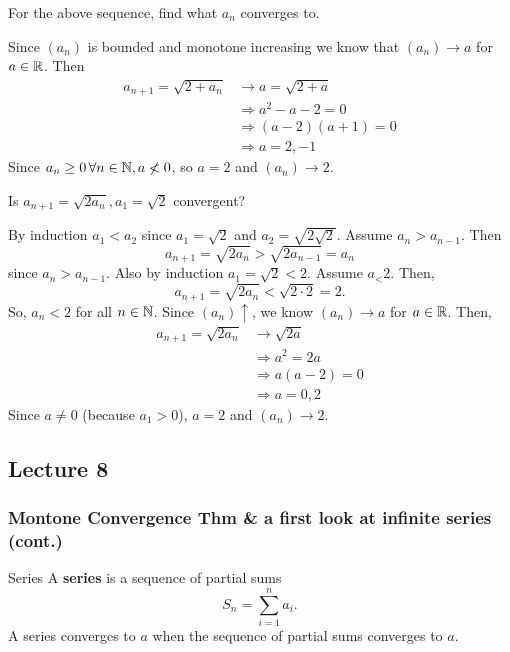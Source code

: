 \begin{example}{}{}
    For the above sequence, find what $a_n$ converges to. 
    \begin{solution}
        Since $(a_n)$ is bounded and monotone increasing we know that $(a_n) \to a$ for $a \in \mathbb R$. Then 
        \begin{align*}
            a_{n+1} = \sqrt{2 + a_n} &\to a = \sqrt{2 + a} \\
            &\Rightarrow a^2 - a - 2 = 0 \\
            &\Rightarrow (a-2)(a+1) = 0 \\
            &\Rightarrow a = 2, -1
        \end{align*}
        Since $a_n \geq 0\, \forall n \in \mathbb N, a \not < 0$, so $a = 2$ and $(a_n) \to 2$. 
    \end{solution}
\end{example}

\begin{example}
    Is $a_{n+1} = \sqrt{2a_n}, a_1 = \sqrt{2}$ convergent?
    \begin{solution}
        By induction $a_1 < a_2$ since $a_1 = \sqrt{2}$ and $a_2 = \sqrt{2\sqrt{2}}$. Assume $a_n > a_{n-1}$. Then
        \[
            a_{n+1} = \sqrt{2a_n} > \sqrt{2a_{n-1}} = a_n 
        \]
        since $a_n > a_{n-1}$. Also by induction $a_1 = \sqrt{2} < 2$. Assume $a_ < 2$. Then, 
        \[
            a_{n+1} = \sqrt{2a_n} < \sqrt{2 \cdot 2} = 2.
        \]
        So, $a_n < 2$ for all $n \in \mathbb N$. Since $(a_n)\uparrow$, we know $(a_n) \to a$ for $a \in \mathbb R$. Then, 
        \begin{align*}
            a_{n+1} = \sqrt{2a_n} &\to \sqrt{2a} \\
            &\Rightarrow a^2 = 2a \\
            &\Rightarrow a(a-2) = 0 \\
            &\Rightarrow a = 0, 2
        \end{align*}
        Since $a \neq 0$ (because $a_1 > 0$), $a = 2$ and $(a_n) \to 2$.
    \end{solution}
\end{example}

\subsection{Lecture 8}
\subsubsection{Montone Convergence Thm \& a first look at infinite series (cont.)}
\begin{defbox}{Series}{}
    A \textbf{series} is a sequence of partial sums 
    \[
        S_n = \sum_{i=1}^{n} a_{i}.
    \]
    A series converges to $a$ when the sequence of partial sums converges to $a$.
\end{defbox}

